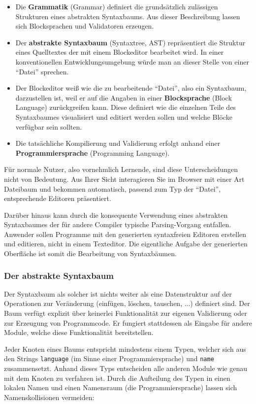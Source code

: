 \documentclass[paper=a4,fontsize=12pt,parskip=half]{scrartcl}
\begin{document}
\begin{itemize}
\item Die \textbf{Grammatik} (Grammar) definiert die grundsätzlich zulässigen Strukturen eines abstrakten Syntaxbaums. Aus dieser Beschreibung lassen sich Blocksprachen und Validatoren erzeugen.
\item Der \textbf{abstrakte Syntaxbaum} (Syntaxtree, AST) repräsentiert die Struktur eines Quelltextes der mit einem Blockeditor bearbeitet wird. In einer konventionellen Entwicklungsumgebung würde man an dieser Stelle von einer \enquote{Datei} sprechen.
\item Der Blockeditor weiß wie die zu bearbeitende \enquote{Datei}, also ein Syntaxbaum, darzustellen ist, weil er auf die Angaben in einer \textbf{Blocksprache} (Block Language) zurückgreifen kann. Diese definiert wie die einzelnen Teile des Syntaxbaumes visualisiert und editiert werden sollen und welche Blöcke verfügbar sein sollten.
\item Die tatsächliche Kompilierung und Validierung erfolgt anhand einer \textbf{Programmiersprache} (Programming Language).
\end{itemize}

Für normale Nutzer, also vornehmlich Lernende, sind diese Unterscheidungen nicht von Bedeutung. Aus Ihrer Sicht interagieren Sie im Browser mit einer Art Dateibaum und bekommen automatisch, passend zum Typ der \enquote{Datei}, entsprechende Editoren präsentiert.

Darüber hinaus kann durch die konsequente Verwendung eines abstrakten Syntaxbaumes der für andere Compiler typische Parsing-Vorgang entfallen. Anwender sollen Programme mit den generierten syntaxfreien Editoren erstellen und editieren, nicht in einem Texteditor. Die eigentliche Aufgabe der generierten Oberfläche ist somit die Bearbeitung von Syntaxbäumen.

\subsubsection{Der abstrakte Syntaxbaum}

Der Syntaxbaum als solcher ist nichts weiter als eine Datenstruktur auf der Operationen zur Veränderung (einfügen, löschen, tauschen, ...) definiert sind. Der Baum verfügt explizit über keinerlei Funktionalität zur eigenen Validierung oder zur Erzeugung von Programmcode. Er fungiert stattdessen als Eingabe für andere Module, welche diese Funktionalität bereitstellen.

Jeder Knoten eines Baums entspricht mindestens einem Typen, welcher sich aus den Strings \texttt{language} (im Sinne einer Programmiersprache) und \texttt{name} zusammensetzt. Anhand dieses Typs entscheiden alle anderen Module wie genau mit dem Knoten zu verfahren ist. Durch die Aufteilung des Typen in einen lokalen Namen und einen Namensraum (die Programmiersprache) lassen sich Namenskollisionen vermeiden:
\end{document}

